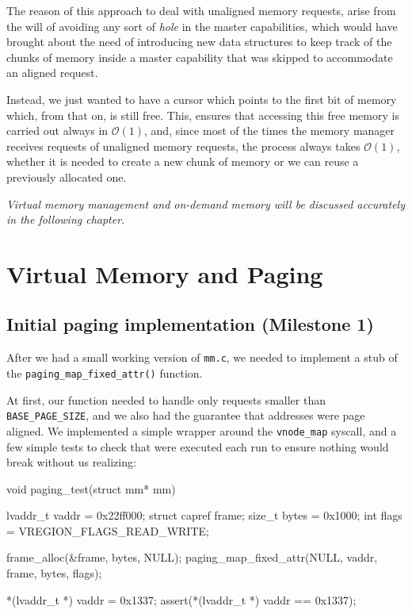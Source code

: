 \documentclass[a4paper,twoside,openright]{report}
\renewcommand{\t}[1]{%
	{\texttt{#1}}}
\newcommand{\bigO}{\mathcal{O}}
\begin{document}
The reason of this approach to deal with unaligned memory requests, arise from the will of avoiding any sort of \emph{hole} in the master capabilities, which would have brought about the need of introducing new data structures to keep track of the chunks of memory inside a master capability that was skipped to accommodate an aligned request.

Instead, we just wanted to have a cursor which points to the first bit of memory which, from that on, is still free.
This, ensures that accessing this free memory is carried out always in $\bigO(1)$, and, since most of the times the memory manager receives requests of unaligned memory requests, the process always takes $\bigO(1)$, whether it is needed to create a new chunk of memory or we can reuse a previously allocated one.


\emph{Virtual memory management and on-demand memory will be discussed accurately in the following chapter.}


\section{Virtual Memory and Paging}

\subsection{Initial paging implementation (Milestone 1)}

After we had a small working version of \texttt{mm.c}, we needed to implement a stub of 
the \texttt{paging\_map\_fixed\_attr()} function.

At first, our function needed to handle only requests smaller than \texttt{BASE\_PAGE\_SIZE}, 
and we also had the guarantee that addresses were page aligned. We implemented a simple wrapper
around the \t{vnode\_map} syscall, and a few simple tests to check that were executed each run to ensure nothing would break without us realizing:


\begin{pandacode} 
void paging_test(struct mm* mm) {
	lvaddr_t vaddr = 0x22ff000;
	struct capref frame;
	size_t bytes = 0x1000;
	int flags = VREGION_FLAGS_READ_WRITE;

	frame_alloc(&frame, bytes, NULL);
	paging_map_fixed_attr(NULL, vaddr, frame, bytes, flags);

	*(lvaddr_t *) vaddr = 0x1337;
	assert(*(lvaddr_t *) vaddr == 0x1337);
}
\end{pandacode}
\end{document}
